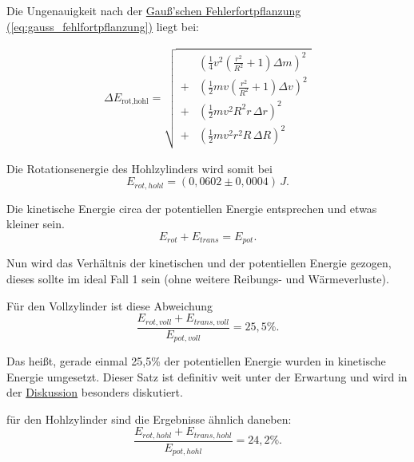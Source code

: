 Die Ungenauigkeit nach der \hyperref[eq:gauss_fehlfortpflanzung]{Gauß'schen Fehlerfortpflanzung (\ref*{eq:gauss_fehlfortpflanzung})} liegt bei:

\begin{align}
\Delta E_{\text{rot,hohl}}
= \sqrt{\begin{aligned}
   &\left( \tfrac{1}{4} v^{2}\left(\tfrac{r^{2}}{R^{2}}+1\right)\Delta m \right)^{2} \\
+  &\left( \tfrac{1}{2} m v \left(\tfrac{r^{2}}{R^{2}}+1\right)\Delta v \right)^{2} \\
+  &\left( \tfrac{1}{2} m v^{2} R^{2} r \,\Delta r \right)^{2} \\
+  &\left( \tfrac{1}{2} m v^{2} r^{2} R \,\Delta R \right)^{2}
\end{aligned}}
\end{align}


Die Rotationsenergie des Hohlzylinders wird somit bei 
\begin{equation}
\boxed{
    E_{rot,hohl} = (0,0602 \pm 0,0004) \, J
}.
\end{equation}

Die kinetische Energie circa der potentiellen Energie entsprechen und etwas kleiner sein.
\begin{equation}
    E_{rot} + E_{trans} = E_{pot}.
\end{equation}

Nun wird das Verhältnis der kinetischen und der potentiellen Energie gezogen, dieses sollte im ideal Fall 1 sein (ohne weitere Reibungs- und Wärmeverluste).

Für den Vollzylinder ist diese Abweichung
\begin{equation}
    \frac{E_{rot,voll} + E_{trans,voll} }{E_{pot,voll}} = 25,5\%.
\end{equation}

Das heißt, gerade einmal 25,5\% der potentiellen Energie wurden in kinetische Energie umgesetzt. Dieser Satz ist definitiv weit unter der Erwartung und wird in der \hyperref[ch:diskussion]{Diskussion} besonders diskutiert.

für den Hohlzylinder sind die Ergebnisse ähnlich daneben:
\begin{equation}
    \frac{E_{rot,hohl} + E_{trans,hohl} }{E_{pot,hohl}} = 24,2\%.
\end{equation}
